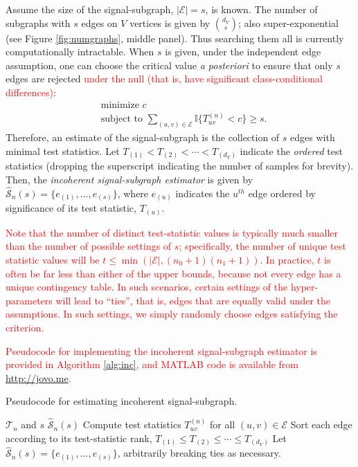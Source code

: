 \documentclass[10pt,journal,cspaper,compsoc]{IEEEtran}
\providecommand{\tr}[1]{\textcolor{red}{#1}}
\newcommand{\II}{\mathbb{I}}           %
\providecommand{\mc}[1]{\mathcal{#1}}
\providecommand{\mhc}[1]{\widehat{\mathcal{#1}}}
\begin{document}
Assume the size of the signal-subgraph, $|\mc{E}|=s$, is known.  The number of subgraphs with $s$ edges on $V$ vertices is given by $\binom{d_V}{s}$; also super-exponential (see Figure \ref{fig:numgraphs}, middle panel). Thus searching them all is currently computationally intractable.  When $s$ is given, under the  independent edge assumption, one can choose the critical value \emph{a posteriori} to ensure that only $s$ edges are rejected \tr{under the null (that is, have significant class-conditional differences)}:
\begin{align}
	&\text{minimize } c \nonumber \\ &\text{subject to } \sum_{(u,v) \in \mc{E}} \II \{T_{uv}^{(n)} < c\} \geq s.
\end{align}
Therefore, an estimate of the signal-subgraph is the collection of $s$ edges with minimal test statistics.  Let $T_{(1)} < T_{(2)} < \cdots < T_{(d_V)}$ indicate the \emph{ordered} test statistics (dropping the superscript indicating the number of samples for brevity).  Then, the \emph{incoherent signal-subgraph estimator} is given by $\mhc{S}_n(s)=\{e_{(1)}, \ldots, e_{(s)}\}$, where $e_{(u)}$ indicates the $u^{th}$ edge ordered by significance of its test statistic, $T_{(u)}$.  %


\tr{Note that the number of distinct test-statistic values is typically much smaller than the number of possible settings of $s$; specifically, the number of unique test statistic values will be $t \leq \min(|\mc{E}|,(n_0+1) (n_1+1))$.  In practice, $t$ is often be far less than either of the upper bounds, because not every edge has a unique contingency table. In such scenarios, certain settings of the hyper-parameters will lead to ``ties'', that is, edges that are equally valid under the assumptions.  In such settings, we simply randomly choose edges satisfying the criterion.}



\tr{Pseudocode for implementing the incoherent signal-subgraph estimator is provided in Algorithm \ref{alg:inc}, and MATLAB code is available from \url{http://jovo.me}.}

\begin{algorithm}
\caption{Pseudocode for estimating incoherent signal-subgraph.}
\label{alg:inc}
\begin{algorithmic}[1]
\REQUIRE $\mc{T}_n$ and $s$
\ENSURE $\mhc{S}_n(s)$
\STATE Compute test statistics $T_{uv}^{(n)}$ for all $(u,v) \in \mc{E}$
\STATE Sort each edge according to its test-statistic rank, $T_{(1)} \leq T_{(2)} \leq \cdots \leq T_{(d_V)}$
\STATE Let $\mhc{S}_n(s)=\{e_{(1)}, \ldots, e_{(s)}\}$, arbitrarily breaking ties as necessary.
\end{algorithmic}
\end{algorithm}
\end{document}

